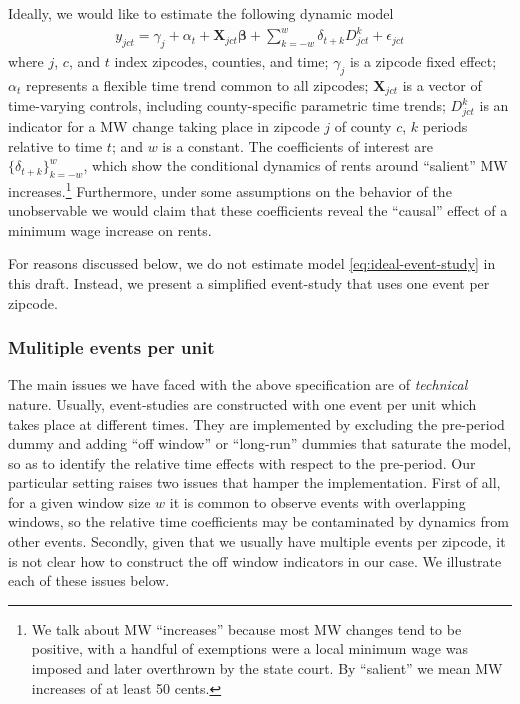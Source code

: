     Ideally, we would like to estimate the following dynamic model
    \begin{equation}\label{eq:ideal-event-study}
        \begin{split}
            y_{jct} = \gamma_{j} + \alpha_{t} + \boldsymbol{X}_{jct} \boldsymbol{\beta} + \sum_{k = -w}^{w}\delta_{t + k} D_{jct}^k + \epsilon_{jct}
        \end{split}   
    \end{equation}
    where $j$, $c$, and $t$ index zipcodes, counties, and time; $\gamma_{j}$ is a zipcode fixed effect; $\alpha_{t}$ represents a flexible time trend common to all zipcodes; $\boldsymbol{X}_{jct}$ is a vector of time-varying controls, including county-specific parametric time trends; $D_{jct}^k$ is an indicator for a MW change taking place in zipcode $j$ of county $c$, $k$ periods relative to time $t$; and $w$ is a constant. The coefficients of interest are $\{\delta_{t + k}\}_{k=-w}^w$, which show the conditional dynamics of rents around ``salient'' MW increases.\footnote{We talk about MW ``increases'' because most MW changes tend to be positive, with a handful of exemptions were a local minimum wage was imposed and later overthrown by the state court. By ``salient'' we mean MW increases of at least 50 cents.} Furthermore, under some assumptions on the behavior of the unobservable we would claim that these coefficients reveal the ``causal'' effect of a minimum wage increase on rents.

    For reasons discussed below, we do not estimate model \eqref{eq:ideal-event-study} in this draft. Instead, we present a simplified event-study that uses one event per zipcode.

\subsubsection{Mulitiple events per unit}

    The main issues we have faced with the above specification are of \textit{technical} nature. Usually, event-studies are constructed with one event per unit which takes place at different times. They are implemented by excluding the pre-period dummy and adding ``off window'' or ``long-run'' dummies that saturate the model, so as to identify the relative time effects with respect to the pre-period. Our particular setting raises two issues that hamper the implementation. First of all, for a given window size $w$ it is common to observe events with overlapping windows, so the relative time coefficients may be contaminated by dynamics from other events. Secondly, given that we usually have multiple events per zipcode, it is not clear how to construct the off window indicators in our case. We illustrate each of these issues below.
    
